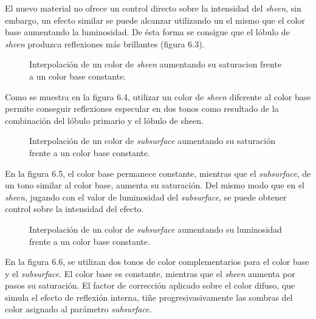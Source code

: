 El nuevo material no ofrece un control directo sobre la intensidad del \textit{sheen}, sin embargo, un efecto similar se puede
alcanzar utilizando un el mismo que el color base aumentando la luminosidad. De \'esta forma se consigue que el l\'obulo
de \textit{sheen} produzca reflexiones m\'as brillantes (figura 6.3).

\begin{figure}[H]
  \vspace{0.5cm}
  \centering
  \caption{Interpolaci\'on de un color de \textit{sheen} aumentando su saturacion frente a un color base constante.}
\end{figure}
\singlespacing

Como se muestra en la figura 6.4, utilizar un color de \textit{sheen} diferente al color base permite conseguir reflexiones especular en dos tonos como
resultado de la combinaci\'on del l\'obulo primario y el l\'obulo de sheen.

\begin{figure}[H]
  \vspace{0.5cm}
  \centering
    \caption{Interpolaci\'on de un color de \textit{subsurface} aumentando su saturaci\'on frente a un color base constante.}
\end{figure}
\singlespacing

En la figura 6.5, el color base permanece constante, mientras que el \textit{subsurface}, de un tono similar al color base,
aumenta su saturaci\'on. Del mismo modo que en el \textit{sheen}, jugando con el valor de luminosidad del \textit{subsurface},
se puede obtener control sobre la intensidad del efecto.


\begin{figure}[H]
  \vspace{0.5cm}
  \centering
    \caption{Interpolaci\'on de un color de \textit{subsurface} aumentando su luminosidad frente a un color base constante.}
 \end{figure}
\singlespacing

En la figura 6.6, se utilizan dos tonos de color complementarios para el color base y el \textit{subsurface}. El color
base es constante, mientras que el \textit{sheen} aumenta por pasos su saturaci\'on.
El factor de correcci\'on aplicado sobre el color difuso, que simula el efecto de reflexi\'on interna, ti\~ne progresivasivamente
las sombras del color asignado al par\'ametro \textit{subsurface}.\\

